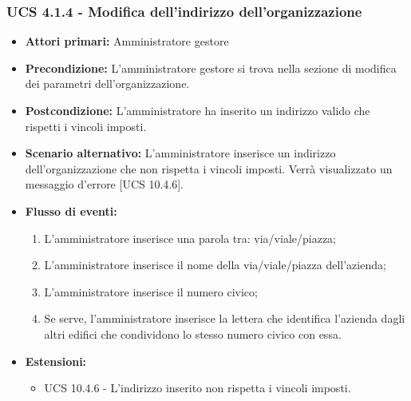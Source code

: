 \subsubsection{UCS 4.1.4 - Modifica dell'indirizzo dell'organizzazione}%

\begin{itemize}
\item \textbf{Attori primari:} Amministratore gestore
\item \textbf{Precondizione:} L'amministratore gestore si trova nella sezione di modifica dei parametri dell'organizzazione.
\item \textbf{Postcondizione:} L'amministratore ha inserito un indirizzo valido che rispetti i vincoli imposti.
\item \textbf{Scenario alternativo:} L'amministratore inserisce un indirizzo dell'organizzazione che non rispetta i vincoli imposti. Verrà visualizzato un messaggio d'errore [UCS 10.4.6].
\item \textbf{Flusso di eventi:}
\begin{enumerate}
    \item L'amministratore inserisce una parola tra: via/viale/piazza;
    \item L'amministratore inserisce il nome della via/viale/piazza dell'azienda;
    \item L'amministratore inserisce il numero civico;
    \item Se serve, l'amministratore inserisce la lettera che identifica l'azienda dagli altri edifici che condividono lo stesso numero civico con essa.
\end{enumerate}
\item \textbf{Estensioni:}
\begin{itemize}
    \item UCS 10.4.6 - L'indirizzo inserito non rispetta i vincoli imposti.
\end{itemize}
\end{itemize}

